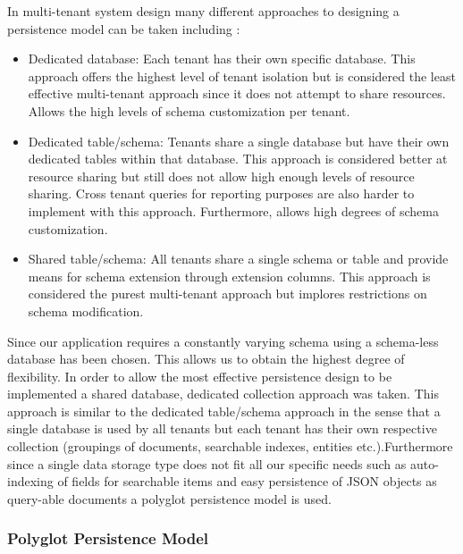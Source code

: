 In multi-tenant system design many different approaches to designing a persistence model can be taken including \cite{Krebs2012}:

\begin{itemize}
\item Dedicated database: Each tenant has their own specific database. This approach offers the highest level of tenant isolation but is considered the least effective multi-tenant approach since it does not attempt to share resources. Allows the high levels of schema customization per tenant.
\item Dedicated table/schema: Tenants share a single database but have their own dedicated tables within that database. This approach is considered better at resource sharing but still does not allow high enough levels of resource sharing. Cross tenant queries for reporting purposes are also harder to implement with this approach. Furthermore, allows high degrees of schema customization.
\item Shared table/schema: All tenants share a single schema or table and provide means for schema extension through extension columns. This approach is considered the purest multi-tenant approach but implores restrictions on schema modification.
\end{itemize}


Since our application requires a constantly varying schema using a schema-less database has been chosen. This allows us to obtain the highest degree of flexibility. In order to allow the most effective persistence design to be implemented a shared database, dedicated collection approach was taken. This approach is similar to the dedicated table/schema approach in the sense that a single database is used by all tenants but each tenant has their own respective collection (groupings of documents, searchable indexes, entities etc.).Furthermore since a single data storage type does not fit all our specific needs such as auto-indexing of fields for searchable items and easy persistence of JSON objects as query-able documents a polyglot persistence model is used.


\subsubsection{Polyglot Persistence Model}


